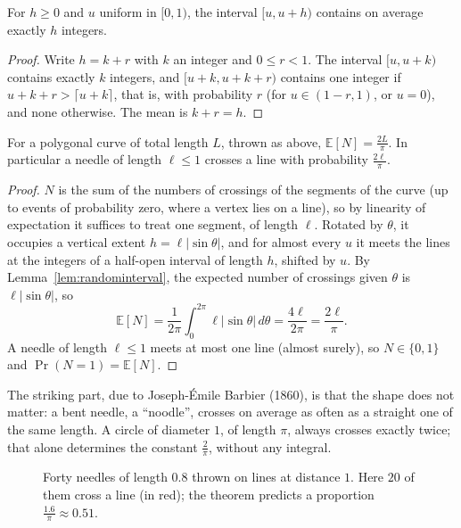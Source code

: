 \begin{lemma}\label{lem:randominterval}
For $h\ge0$ and $u$ uniform in $[0,1)$, the interval $[u,u+h)$ contains on average exactly $h$ integers.
\end{lemma}

\begin{proof}
Write $h=k+r$ with $k$ an integer and $0\le r<1$. The interval $[u,u+k)$ contains exactly $k$ integers, and $[u+k,u+k+r)$ contains one integer if
$u+k+r>\lceil u+k\rceil$, that is, with probability $r$ (for $u\in(1-r,1)$, or $u=0$), and none otherwise. The mean is $k+r=h$.
\end{proof}

\begin{theorem}\label{thm:buffon}
For a polygonal curve of total length $L$, thrown as above, $\mathbb E[N]=\frac{2L}\pi$. In particular a needle of length $\ell\le1$ crosses a line with
probability $\frac{2\ell}\pi$.
\end{theorem}

\begin{proof}
$N$ is the sum of the numbers of crossings of the segments of the curve (up to events of probability zero, where a vertex lies on a line), so by
linearity of expectation it suffices to treat one segment, of length $\ell$. Rotated by $\theta$, it occupies a vertical extent $h=\ell|\sin\theta|$, and for
almost every $u$ it meets the lines at the integers of a half-open interval of length $h$, shifted by $u$. By Lemma~\ref{lem:randominterval}, the expected
number of crossings given $\theta$ is $\ell|\sin\theta|$, so
\[
\mathbb E[N]=\frac1{2\pi}\int_0^{2\pi}\ell|\sin\theta|\,d\theta=\frac{4\ell}{2\pi}=\frac{2\ell}\pi.
\]
A needle of length $\ell\le1$ meets at most one line (almost surely), so $N\in\{0,1\}$ and $\Pr(N=1)=\mathbb E[N]$.
\end{proof}

The striking part, due to Joseph-\'Emile Barbier (1860), is that the shape does not matter: a bent needle, a ``noodle'', crosses on average as often as a
straight one of the same length. A circle of diameter $1$, of length $\pi$, always crosses exactly twice; that alone determines the constant
$\frac2\pi$, without any integral.

\begin{figure}[ht]
\centering
{}
\caption{Forty needles of length $0.8$ thrown on lines at distance $1$. Here $20$ of them cross a line (in red); the theorem predicts a proportion
$\frac{1.6}\pi\approx0.51$.}
\label{fig:buffon}
\end{figure}

